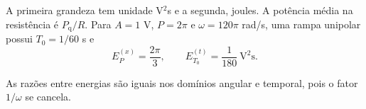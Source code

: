A primeira grandeza tem unidade V$^2$s e a segunda, joules.
A potência média na resistência é $P_{\mathrm{q}}/R$.
Para $A=1$ V, $P=2\pi$ e $\omega=120\pi$ rad/s, uma rampa
unipolar possui $T_0=1/60$ s e
\begin{equation}
    E_P^{(x)}=\frac{2\pi}{3}, \qquad
    E_{T_0}^{(t)}=\frac{1}{180}\ \mathrm{V^2s}.
\end{equation}

As razões entre energias são iguais nos domínios angular e temporal,
pois o fator $1/\omega$ se cancela.
